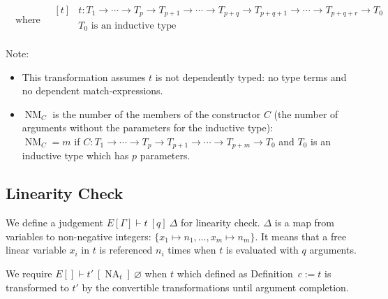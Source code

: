 \documentclass[a4paper,fleqn]{article}
\newcommand{\kwDefinition}{\mbox{\color{myviolet}\ttfamily Definition}}
\newcommand{\kwmatch}{\mbox{\color{mygreen}\ttfamily match}}
\DeclareMathOperator{\NA}{NA}
\DeclareMathOperator{\NM}{NM}
\begin{document}
\[ \quad\text{where} \quad
  \begin{aligned}[t]
    & t : T_1 \rightarrow \dotsb \rightarrow T_p \rightarrow
          T_{p+1} \rightarrow \dotsb \rightarrow T_{p+q} \rightarrow
          T_{p+q+1} \rightarrow \dotsb \rightarrow T_{p+q+r} \rightarrow T_0 \\
    & \text{$T_0$ is an inductive type} \\
  \end{aligned}
\]
\raggedright
{\small Note:
\begin{itemize}
  \item This transformation assumes $t$ is not dependently typed: no type terms and no dependent \kwmatch-expressions.
  \item $\NM_C$ is the number of the members of the constructor $C$ (the number of arguments without the parameters for the inductive type): \\
    $\NM_C=m$ if $C : T_1 \rightarrow \dotsb \rightarrow T_p \rightarrow T_{p+1} \rightarrow \dotsb \rightarrow T_{p+m} \rightarrow T_0$ and $T_0$ is an inductive type which has $p$ parameters.
\end{itemize}}

\subsection{Linearity Check}\label{sec:linearity-check}

We define a judgement $E[\Gamma] \vdash t~[q]~\Delta$ for linearity check.
$\Delta$ is a map from variables to non-negative integers: $\{x_1 \mapsto n_1, \dotsc, x_m \mapsto n_m\}$.
It means that a free linear variable $x_i$ in $t$ is referenced $n_i$ times when $t$ is evaluated with $q$ arguments.

We require $E[] \vdash t'~[\NA_t]~\varnothing$ when $t$ which defined as \kwDefinition~$c := t$ is transformed to $t'$ by the convertible transformations until argument completion.
\end{document}
